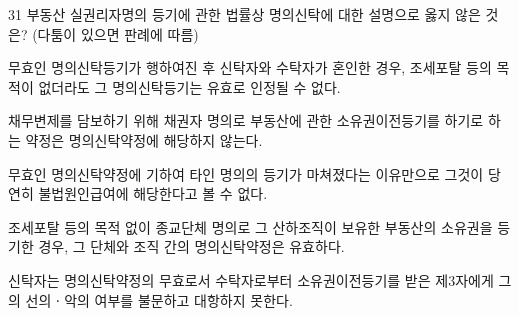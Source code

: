 \begin{question}{31}
부동산 실권리자명의 등기에 관한 법률상 명의신탁에 대한 설명으로 옳지 않은 것은? (다툼이 있으면 판례에 따름)
\begin{choices}
  \item 무효인 명의신탁등기가 행하여진 후 신탁자와 수탁자가 혼인한 경우, 조세포탈 등의 목적이 없더라도 그 명의신탁등기는 유효로 인정될 수 없다.
  \item 채무변제를 담보하기 위해 채권자 명의로 부동산에 관한 소유권이전등기를 하기로 하는 약정은 명의신탁약정에 해당하지 않는다.
  \item 무효인 명의신탁약정에 기하여 타인 명의의 등기가 마쳐졌다는 이유만으로 그것이 당연히 불법원인급여에 해당한다고 볼 수 없다.
  \item 조세포탈 등의 목적 없이 종교단체 명의로 그 산하조직이 보유한 부동산의 소유권을 등기한 경우, 그 단체와 조직 간의 명의신탁약정은 유효하다.
  \item 신탁자는 명의신탁약정의 무효로서 수탁자로부터 소유권이전등기를 받은 제3자에게 그의 선의ㆍ악의 여부를 불문하고 대항하지 못한다.
\end{choices}
\end{question}
